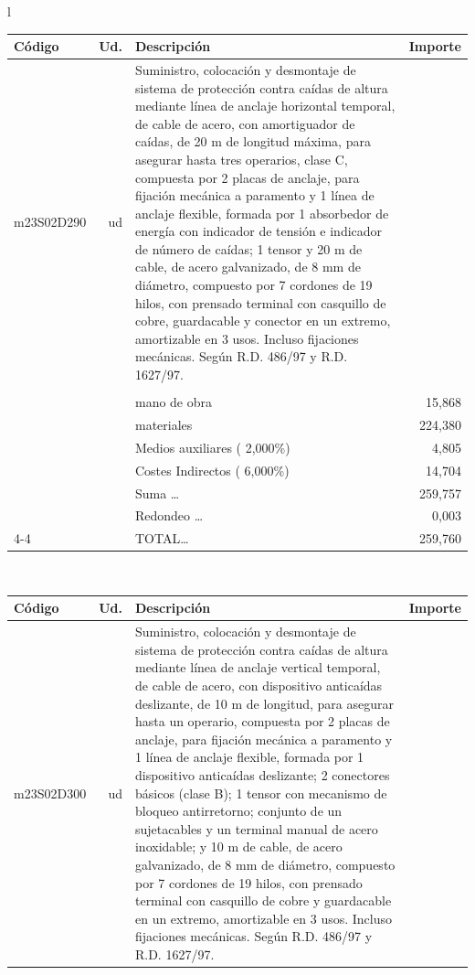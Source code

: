 \documentclass{book}%
\begin{document}
\begin{longtable}{l}
\begin{tabular}{l r p{60mm} r}%
Código&Ud.&Descripción&Importe\\%
\hline%
m23S02D290&ud&Suministro, colocación y desmontaje de sistema de protección contra caídas de altura mediante línea de anclaje horizontal temporal, de cable de acero, con amortiguador de caídas, de 20 m de longitud máxima, para asegurar hasta tres operarios, clase C, compuesta por 2 placas de anclaje, para fijación mecánica a paramento y 1 línea de anclaje flexible, formada por 1 absorbedor de energía con indicador de tensión e indicador de número de caídas; 1 tensor y 20 m de cable, de acero galvanizado, de 8 mm de diámetro, compuesto por 7 cordones de 19 hilos, con prensado terminal con casquillo de cobre, guardacable y conector en un extremo, amortizable en 3 usos. Incluso fijaciones mecánicas. Según R.D. 486/97 y R.D. 1627/97.&\\%
&&&\\%
&&mano de obra&    15,868\\%
&&materiales&   224,380\\%
&&Medios auxiliares (     2,000\%)&     4,805\\%
&&Costes Indirectos (     6,000\%)&    14,704\\%
&&Suma \ldots&   259,757\\%
&&Redondeo \ldots&     0,003\\%
\cline{4-4}%
&&TOTAL\ldots&   259,760\\%
\end{tabular}\\%
\begin{tabular}{l r p{60mm} r}%
Código&Ud.&Descripción&Importe\\%
\hline%
m23S02D300&ud&Suministro, colocación y desmontaje de sistema de protección contra caídas de altura mediante línea de anclaje vertical temporal, de cable de acero, con dispositivo anticaídas deslizante, de 10 m de longitud, para asegurar hasta un operario, compuesta por 2 placas de anclaje, para fijación mecánica a paramento y 1 línea de anclaje flexible, formada por 1 dispositivo anticaídas deslizante; 2 conectores básicos (clase B); 1 tensor con mecanismo de bloqueo antirretorno; conjunto de un sujetacables y un terminal manual de acero inoxidable; y 10 m de cable, de acero galvanizado, de 8 mm de diámetro, compuesto por 7 cordones de 19 hilos, con prensado terminal con casquillo de cobre y guardacable en un extremo, amortizable en 3 usos. Incluso fijaciones mecánicas. Según R.D. 486/97 y R.D. 1627/97.&\\%

\end{tabular}
\end{longtable}
\end{document}

